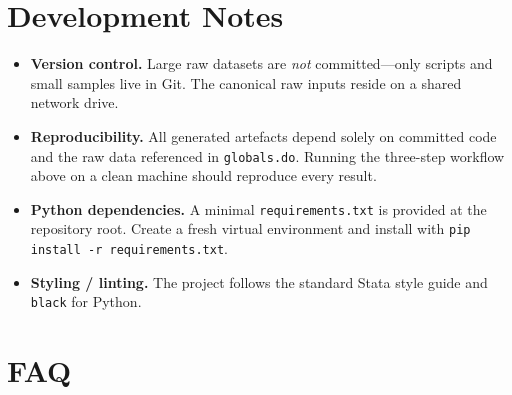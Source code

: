 \documentclass[11pt]{article}
\newcommand{\code}[1]{\texttt{#1}}
\begin{document}
\section{Development Notes}

\begin{itemize}
  \item \textbf{Version control.}  Large raw datasets are \emph{not}
        committed—only scripts and small samples live in Git. The canonical raw
        inputs reside on a shared network drive.

  \item \textbf{Reproducibility.}  All generated artefacts depend solely on
        committed code and the raw data referenced in \code{globals.do}.
        Running the three-step workflow above on a clean machine should
        reproduce every result.

  \item \textbf{Python dependencies.}  A minimal \code{requirements.txt} is
        provided at the repository root.  Create a fresh virtual environment
        and install with \code{pip install -r requirements.txt}.

  \item \textbf{Styling / linting.}  The project follows the standard Stata
        style guide and \code{black} for Python.
\end{itemize}

\section{FAQ}
\end{document}
